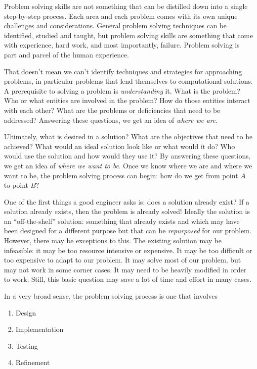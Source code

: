 Problem solving skills are not something that can be distilled down into 
a single step-by-step process.  Each area and each problem comes with
its own unique challenges and considerations.  General problem solving 
techniques can be identified, studied and taught, but problem solving skills 
are something that come with experience, hard work, and most importantly, 
failure.  Problem solving is part and parcel of the human experience.  

That doesn't mean we can't identify techniques and strategies for
approaching problems, in particular problems that lend themselves to
computational solutions.  A prerequisite to solving a problem is 
\emph{understanding} it.  What is the problem?  Who or what entities
are involved in the problem?  How do those entities interact with each
other?  What are the problems or deficiencies that need to be addressed?
Answering these questions, we get an idea of \emph{where we are}.

Ultimately, what is desired in a solution?  What are the objectives that
need to be achieved?  What would an ideal solution look like or what
would it do?  Who would use the solution and how would they use it?
By answering these questions, we get an idea of \emph{where we want to be}.
Once we know where we are and where we want to be, the problem solving
process can begin: how do we get from point $A$ to point $B$?

One of the first things a good engineer asks is: does a solution already exist?
If a solution already exists, then the problem is already solved!  Ideally the
solution is an ``off-the-shelf'' solution: something that already exists 
and which may have been designed for a different purpose but that can
be \emph{repurposed} for our problem.  However, there may be exceptions
to this.  The existing solution may be infeasible: it may be too resource
intensive or expensive.  It may be too difficult or too expensive to adapt
to our problem.  It may solve most of our problem, but may not work in
some corner cases.  It may need to be heavily modified in order to
work.  Still, this basic question may save a lot of time and effort in many
cases.  

In a very broad sense, the problem solving process is one that involves
\begin{enumerate}
  \item Design
  \item Implementation
  \item Testing
  \item Refinement
\end{enumerate}

